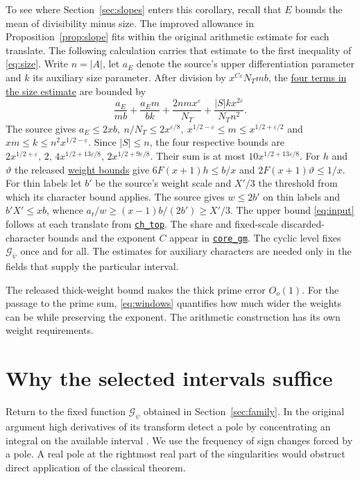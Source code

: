 \documentclass[11pt,letterpaper]{article}
\newcommand{\eps}{\varepsilon}
\newcommand{\src}[2]{\href{https://github.com/leanprover-community/riemann-hypothesis/blob/main/src/#1.lean}{#2}}
\numberwithin{equation}{section}
\begin{document}
To see where Section~\ref{sec:slopes} enters this corollary, recall that \(E\) bounds the mean of divisibility minus size. The improved allowance in Proposition~\ref{prop:slope} fits within the original arithmetic estimate for each translate. The following calculation carries that estimate to the first inequality of \eqref{eq:size}. Write \(n=|A|\), let \(a_E\) denote the source's upper differentiation parameter and \(k\) its auxiliary size parameter. After division by \(x^{C\eps}N_Tmb\), the
\src{Formalism/SizeWindowBrackets/ChainSlopeWindows/LipschitzWeightAndMinimum}{four terms in the size estimate}
are bounded by
\[
 \frac{a_E}{mb}+\frac{a_E m}{bk}
       +\frac{2nm x^\eps}{N_T}+\frac{|S|k x^{2\eps}}{N_T n^2}.
\]
The source gives \(a_E\le2xb,\ n/N_T\le2x^{\eps/8},\
x^{1/2-\eps}\le m\le x^{1/2+\eps/2}\) and \(xm\le k\le n^2 x^{1/2-\eps}\). Since \(|S|\le n\), the four respective bounds are \(2x^{1/2+\eps},\,2,\,4x^{1/2+13\eps/8},\,2x^{1/2+9\eps/8}\). Their sum is at most \(10x^{1/2+13\eps/8}\).
For \(h\) and \(\vartheta\) the released
\src{Formalism/SizeWindowBrackets/SChain}{weight bounds}
give \(6F(x+1)h\le b/x\) and \(2F(x+1)\vartheta\le1/x\).
For thin labels let \(b'\) be the source's weight scale and \(X'/3\) the threshold from which its character bound applies. The source gives
\(w\le2b'\) on thin labels and \(b'X'\le xb\), whence
\(a_t/w\ge (x-1)b/(2b')\ge X'/3\).
The upper bound \eqref{eq:input} follows at each translate from
\src{Development/AutomorphicArithmetic/DedekindLFunctions/LandauTheorems/ChTop}{\texttt{ch\_top}}.
The share and fixed-scale discarded-character bounds and the exponent \(C\) appear in
\src{Development/AutomorphicArithmetic/PrimitiveCosets/CoreGm}{\texttt{core\_gm}}.
The cyclic level fixes \(\mathcal G_\psi\) once and for all. The estimates for auxiliary characters are needed only in the fields that supply the particular interval.

The released thick-weight bound makes the thick prime error \(O_o(1)\). For the passage to the prime sum, \eqref{eq:windows} quantifies how much wider the weights can be while preserving the exponent. The arithmetic construction has its own weight requirements.

\section{Why the selected intervals suffice}\label{sec:zeros}

Return to the fixed function \(\mathcal G_\psi\) obtained in Section~\ref{sec:family}. In the original argument high derivatives of its transform detect a pole by concentrating an integral on the available interval \cite[\S3.3]{jaswal}. We use the frequency of sign changes forced by a pole. A real pole at the rightmost real part of the singularities would obstruct direct application of the classical theorem.
\end{document}
